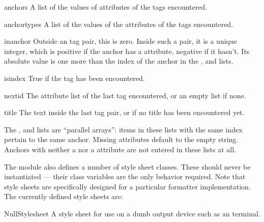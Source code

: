 \begin{datadesc}{anchors}
A list of the values of  attributes of the  tags
encountered.
\end{datadesc}

\begin{datadesc}{anchortypes}
A list of the values of the  attributes of the 
tags encountered.
\end{datadesc}

\begin{datadesc}{inanchor}
Outside an  tag pair, this is zero.  Inside such a
pair, it is a unique integer, which is positive if the anchor has a
 attribute, negative if it hasn't.  Its absolute value is
one more than the index of the anchor in the ,
 and  lists.
\end{datadesc}

\begin{datadesc}{isindex}
True if the  tag has been encountered.
\end{datadesc}

\begin{datadesc}{nextid}
The attribute list of the last  tag encountered, or
an empty list if none.
\end{datadesc}

\begin{datadesc}{title}
The text inside the last  tag pair, or
 if no title has been encountered yet.
\end{datadesc}

The ,  and  lists
are ``parallel arrays'': items in these lists with the same index
pertain to the same anchor.  Missing attributes default to the empty
string.  Anchors with neither a  nor a 
attribute are not entered in these lists at all.

The module also defines a number of style sheet classes.  These should
never be instantiated --- their class variables are the only behavior
required.  Note that style sheets are specifically designed for a
particular formatter implementation.  The currently defined style
sheets are:

\begin{datadesc}{NullStylesheet}
A style sheet for use on a dumb output device such as an \ASCII{}
terminal.
\end{datadesc}

